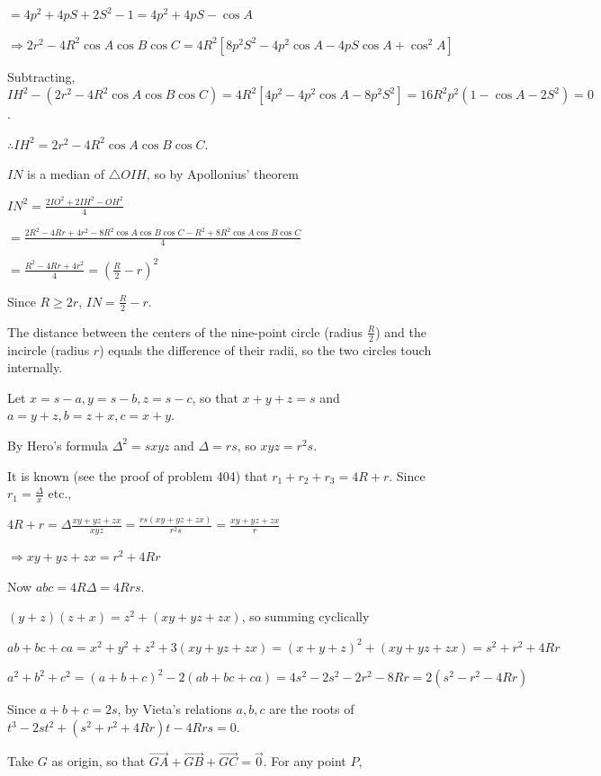   $= 4p^2 + 4pS + 2S^2 - 1 = 4p^2 + 4pS - \cos A$

  $\Rightarrow 2r^2 - 4R^2\cos A\cos B\cos C = 4R^2\left[8p^2S^2 - 4p^2\cos A - 4pS\cos A + \cos^2A\right]$

  Subtracting, $IH^2 - (2r^2 - 4R^2\cos A\cos B\cos C) = 4R^2\left[4p^2 - 4p^2\cos A - 8p^2S^2\right] =
  16R^2p^2(1 - \cos A - 2S^2) = 0$.

  $\therefore IH^2 = 2r^2 - 4R^2\cos A\cos B\cos C$.
\item $IN$ is a median of $\triangle OIH$, so by Apollonius' theorem

  $IN^2 = \frac{2IO^2 + 2IH^2 - OH^2}{4}$

  $= \frac{2R^2 - 4Rr + 4r^2 - 8R^2\cos A\cos B\cos C - R^2 + 8R^2\cos A\cos B\cos C}{4}$

  $= \frac{R^2 - 4Rr + 4r^2}{4} = \left(\frac{R}{2} - r\right)^2$

  Since $R\geq 2r$, $IN = \frac{R}{2} - r$.

  The distance between the centers of the nine-point circle (radius $\frac{R}{2}$) and the incircle (radius
  $r$) equals the difference of their radii, so the two circles touch internally.
\item Let $x = s - a, y = s - b, z = s - c$, so that $x + y + z = s$ and $a = y + z, b = z + x, c = x + y$.

  By Hero's formula $\Delta^2 = sxyz$ and $\Delta = rs$, so $xyz = r^2s$.

  It is known (see the proof of problem 404) that $r_1 + r_2 + r_3 = 4R + r$. Since $r_1 = \frac{\Delta}{x}$
  etc.,

  $4R + r = \Delta\frac{xy + yz + zx}{xyz} = \frac{rs(xy + yz + zx)}{r^2s} = \frac{xy + yz + zx}{r}$

  $\Rightarrow xy + yz + zx = r^2 + 4Rr$

  Now $abc = 4R\Delta = 4Rrs$.

  $(y + z)(z + x) = z^2 + (xy + yz + zx)$, so summing cyclically

  $ab + bc + ca = x^2 + y^2 + z^2 + 3(xy + yz + zx) = (x + y + z)^2 + (xy + yz + zx) = s^2 + r^2 + 4Rr$

  $a^2 + b^2 + c^2 = (a + b + c)^2 - 2(ab + bc + ca) = 4s^2 - 2s^2 - 2r^2 - 8Rr = 2(s^2 - r^2 - 4Rr)$

  Since $a + b + c = 2s$, by Vieta's relations $a, b, c$ are the roots of $t^3 - 2st^2 + (s^2 + r^2 + 4Rr)t
  - 4Rrs = 0$.
\item Take $G$ as origin, so that $\vec{GA} + \vec{GB} + \vec{GC} = \vec{0}$. For any point $P$,

